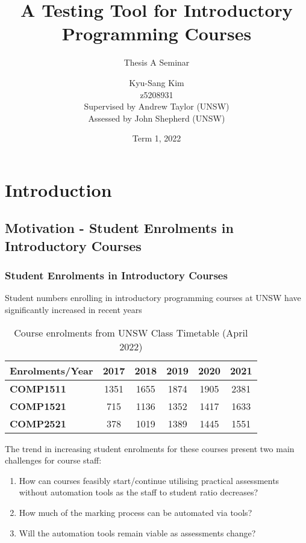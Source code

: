 \documentclass[xcolor]{beamer}
\author[Kyu-Sang Kim]{Kyu-Sang Kim\\z5208931\\\vspace{0.2cm}Supervised by Andrew Taylor (UNSW)\\Assessed by John Shepherd (UNSW)}
\title[Thesis A Seminar]{A Testing Tool for Introductory Programming Courses}
\subtitle{Thesis A Seminar}
\date{Term 1, 2022}
\begin{document}
\begin{frame}
	\titlepage
\end{frame}


\section{Introduction}
\subsection{Motivation - Student Enrolments in Introductory Courses}
\begin{frame}
	\frametitle{Student Enrolments in Introductory Courses}
	Student numbers enrolling in introductory programming courses at UNSW have significantly increased in recent years\\
		\pause
	\begin{table}[h!]
		\centering
		\begin{tabular}{|l|c|c|c|c|c|}
			\hline
			\textbf{Enrolments/Year} & \textbf{2017} & \textbf{2018} & \textbf{2019} & \textbf{2020} & \textbf{2021} \\ 
			\hline
			\textbf{COMP1511} & 1351 & 1655 & 1874 & 1905 & 2381\\ 
			\hline
			\textbf{COMP1521} & 715 & 1136 & 1352 & 1417 & 1633\\
			\hline
			\textbf{COMP2521} & 378 & 1019 & 1389 & 1445 & 1551\\
			\hline
		\end{tabular}
		\caption{Course enrolments from UNSW Class Timetable (April 2022)}
		\label{table:1}
		\vspace{-4mm}
	\end{table}
		\pause
	The trend in increasing student enrolments for these courses present two main challenges for course staff:\\
		\pause
	\begin{enumerate}
		\item How can courses feasibly start/continue utilising practical assessments without automation tools as the staff to student ratio decreases?
			\pause
		\item How much of the marking process can be automated via tools?
			\pause
		\item Will the automation tools remain viable as assessments change?
	\end{enumerate}
\end{frame}
\end{document}
